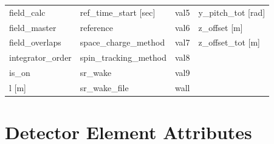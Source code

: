 \begin{tabular}{llll}
field_calc                       & ref_time_start [sec]             & val5                             & y_pitch_tot [rad]                \\
field_master                     & reference                        & val6                             & z_offset [m]                     \\
field_overlaps                   & space_charge_method              & val7                             & z_offset_tot [m]                 \\
integrator_order                 & spin_tracking_method             & val8                             &                                  \\
is_on                            & sr_wake                          & val9                             &                                  \\
l [m]                            & sr_wake_file                     & wall                             &                                  \\
 \bottomrule
 \end{tabular}
 \vfill
 
 \section{Detector Element Attributes}
 \label{s:list.detector}
 
